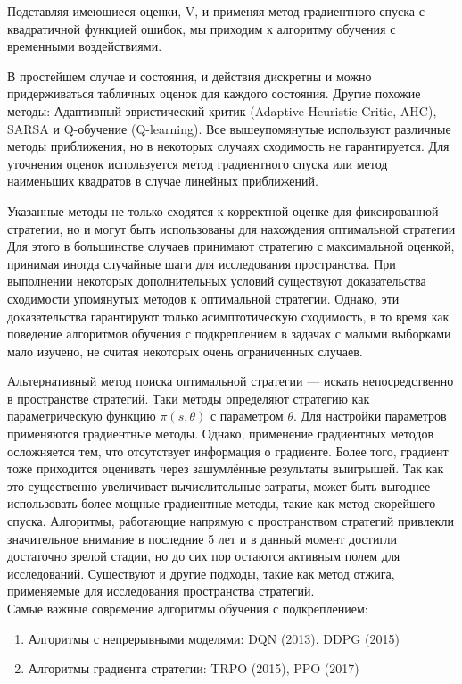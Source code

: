 \documentclass[a4paper,12pt]{article}
\begin{document}
Подставляя имеющиеся оценки, V, и применяя метод градиентного спуска с квадратичной функцией ошибок, мы приходим к алгоритму обучения с временными воздействиями.

В простейшем случае и состояния, и действия дискретны и можно придерживаться табличных оценок для каждого состояния. Другие похожие методы: Адаптивный эвристический критик (Adaptive Heuristic Critic, AHC), SARSA и Q-обучение (Q-learning). Все вышеупомянутые используют различные методы приближения, но в некоторых случаях сходимость не гарантируется. Для уточнения оценок используется метод градиентного спуска или метод наименьших квадратов в случае линейных приближений.

Указанные методы не только сходятся к корректной оценке для фиксированной стратегии, но и могут быть использованы для нахождения оптимальной стратегии Для этого в большинстве случаев принимают стратегию с максимальной оценкой, принимая иногда случайные шаги для исследования пространства. При выполнении некоторых дополнительных условий существуют доказательства сходимости упомянутых методов к оптимальной стратегии. Однако, эти доказательства гарантируют только асимптотическую сходимость, в то время как поведение алгоритмов обучения с подкреплением в задачах с малыми выборками мало изучено, не считая некоторых очень ограниченных случаев.

Альтернативный метод поиска оптимальной стратегии — искать непосредственно в пространстве стратегий. Таки методы определяют стратегию как параметрическую функцию $\pi (s,\theta )$ с параметром $\theta$. Для настройки параметров применяются градиентные методы. Однако, применение градиентных методов осложняется тем, что отсутствует информация о градиенте. Более того, градиент тоже приходится оценивать через зашумлённые результаты выигрышей. Так как это существенно увеличивает вычислительные затраты, может быть выгоднее использовать более мощные градиентные методы, такие как метод скорейшего спуска. Алгоритмы, работающие напрямую с пространством стратегий привлекли значительное внимание в последние 5 лет и в данный момент достигли достаточно зрелой стадии, но до сих пор остаются активным полем для исследований. Существуют и другие подходы, такие как метод отжига, применяемые для исследования пространства стратегий. 
\\

Самые важные современие адгоритмы обучения с подкреплением:
\begin{enumerate}
    \item Алгоритмы с непрерывными моделями: DQN (2013), DDPG (2015)
    \item Алгоритмы градиента стратегии: TRPO (2015), PPO (2017)
\end{enumerate}
\newpage
\end{document}
